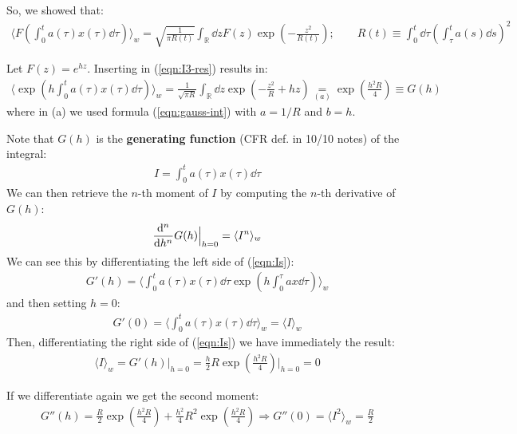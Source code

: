 \documentclass[../template.tex]{subfiles}
\begin{document}
So, we showed that:
\begin{align}
    \langle F\left(\int_0^t a(\tau) x(\tau)\dd{\tau}\right) \rangle_w = \sqrt{\frac{1}{ \pi R(t)} } \int_{\mathbb{R}} \dd{z} F(z) \exp\left(-\frac{z^2}{R(t)} \right); \qquad R(t) \equiv \int_0^t \dd{\tau}\left(\int_\tau^t a(s) \dd{s}\right)^2
    \label{eqn:I3-res}
\end{align}

\newpage 
\begin{example}
    Let $F(z) = e^{hz}$. Inserting in (\ref{eqn:I3-res}) results in:
    \begin{align}
        \langle \exp\left(h \int_0^t a(\tau) x(\tau) \dd{\tau}\right) \rangle_w = \frac{1}{ \sqrt{\pi R}}  \int_{\mathbb{R}} \dd{z} \exp\left(-\frac{z^2}{R} + hz \right) \underset{(a)}{=}  \exp\left(\frac{h^2 R}{4} \right) \equiv G(h)
        \label{eqn:Is}
    \end{align}
    where in (a) we used formula (\ref{eqn:gauss-int}) with $a=1/R$ and $b=h$. 
    
    Note that $G(h)$ is the \textbf{generating function} (CFR def. in 10/10 notes) of the integral:
    \begin{align*}
        I=\int_0^t a(\tau) x(\tau) \dd{\tau}
    \end{align*}   
    We can then retrieve the $n$-th moment of $I$ by computing the $n$-th derivative of $G(h)$:
    \begin{align*}
        \dv[n]{h} G(h)\Big|_{h = 0} = \langle I^n \rangle_w
    \end{align*} 
    We can see this by differentiating the left side of (\ref{eqn:Is}):      
    \begin{align*}
        G'(h) = \langle \int_0^t a(\tau) x(\tau) \dd{\tau} \exp\left(h \int_0^\tau a x \dd{\tau}\right) \rangle_w
    \end{align*}
    and then setting $h = 0$:
    \begin{align*}
        G'(0) = \langle \int_0^t a(\tau) x(\tau) \dd{\tau} \rangle_w = \langle I \rangle_w
    \end{align*}  
    Then, differentiating the right side of (\ref{eqn:Is}) we have immediately the result:
    \begin{align*}
        \langle I \rangle_w = G'(h)\Big|_{h=0} =  \frac{h}{2} R \exp\left(\frac{h^2 R}{4} \right) \Big|_{h = 0} = 0
    \end{align*}

    If we differentiate again we get the second moment:
    \begin{align*}
        G''(h) = \frac{R}{2} \exp\left(\frac{h^2 R}{4} \right) + \frac{h^2}{4} R^2 \exp\left(\frac{h^2 R}{4} \right) \Rightarrow G''(0) = \langle I^2 \rangle_w = \frac{R}{2}  
    \end{align*} 
    

\end{example}
\end{document}
